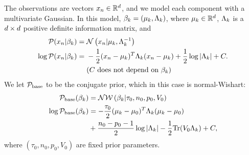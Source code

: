 \begin{ex}
%
The observations are vectors $x_n \in \mathbb{R}^d$,
and we model each component with a multivariate Gaussian.
In this model, $\beta_k = (\mu_k, \Lambda_k)$,
where $\mu_k \in \mathbb{R}^d$, $\Lambda_k$ is a $d\times d$ positive
definite information matrix, and
%
\begin{align*}
%
\p(\x_\n \vert \beta_\k) ={}& \normdist{\x_n \vert \mu_\k, \Lambda_\k^{-1}} \\
\logp(\x_\n \vert \beta_\k) ={}&
    -\frac{1}{2}(\x_n - \mu_k)^T \Lambda_\k (\x_n - \mu_k)
    + \frac{1}{2} \log |\Lambda_\k| + \const.\\
    & \constdesc{\beta_\k}
%
\end{align*}
We let $\mathcal{P}_{\mathrm{base}}$ to be the conjugate prior, which in this case is normal-Wishart:
\begin{align*}
  \mathcal{P}_{\mathrm{base}}(\beta_k) &= \mathcal{N}\mathcal{W}\left(\beta_k \vert \tau_0, n_0, p_0, V_0\right)\\
  \log\mathcal{P}_{\mathrm{base}}(\beta_k) &=
      -\frac{\tau_0}{2}(\mu_k - \mu_0)^T \Lambda_k (\mu_k - \mu_0)\\
      &{} + \frac{n_0 - p_0 - 1}{2} \log |\Lambda_k| -
      \frac{1}{2} \textrm{Tr}(V_0 \Lambda_k) + C,
\end{align*}
where $(\tau_0, n_0, p_0, V_0)$ are fixed prior parameters.


%
\end{ex}

